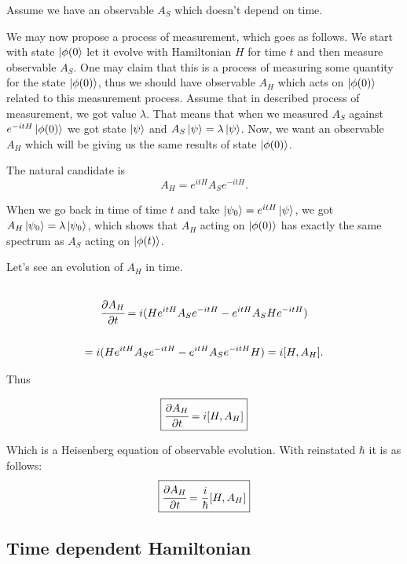 \documentclass[main.tex]{subfiles}
\begin{document}
Assume we have an observable $A_S$ which doesn't depend on time.

We may now propose a process of measurement, which goes as follows. We start with state $\ket{\phi(0}$ let it evolve with Hamiltonian $H$ for time $t$ and then measure observable $A_S$. One may claim that this is a process of measuring some quantity for the state $\ket{\phi(0)}$, thus we should have observable $A_H$ which acts on $\ket{\phi(0)}$ related to this measurement process. Assume that in described process of measurement, we got value $\lambda$. That means that when we measured $A_S$ against 
$e^{-itH}\ket{\phi(0)}$ we got state $\ket{\psi}$ and $A_S \ket{\psi} = \lambda \ket{\psi}$. Now, we want an observable $A_H$ which will be giving us the same results of state $\ket{\phi(0)}$.

The natural candidate is 
\begin{equation}
\label{magic-heisenberg}
A_H = e^{itH} A_S e^{-itH}.
\end{equation}

When we go back in time of time $t$ and take $\ket{\psi_0} = e^{itH} \ket{\psi}$, we got $A_H \ket{\psi_0} = \lambda \ket{\psi_0}$, which shows that $A_H$ acting on $\ket{\phi(0)}$ has exactly the same spectrum as $A_S$ acting on $\ket{\phi(t)}$.

Let's see an evolution of $A_H$ in time.
\begin{multline*}
\\
\cfrac{\partial A_H}{\partial t} = i(H e^{itH} A_S e^{-itH} - e^{itH} A_S He^{-itH})\\
\\ = i(H e^{itH} A_S e^{-itH} - e^{itH} A_S e^{-itH}H) = i[H,A_H].
\\
\end{multline*}

Thus

\begin{equation}
\label{time-independent-heisenberg}
\boxed{
\cfrac{\partial A_H}{\partial t} = i[H,A_H]
}
\end{equation}

Which is a Heisenberg equation of observable evolution.
With reinstated $\hbar$ it is as follows:
\begin{equation}
\boxed{
\cfrac{\partial A_H}{\partial t} = \frac{i}{\hbar}[H, A_H]
}
\end{equation}

\subsection{Time dependent Hamiltonian}
\end{document}
